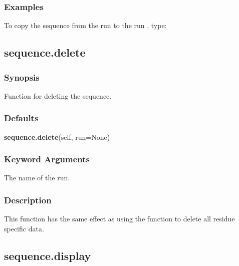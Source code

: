 \subsubsection{Examples}

To copy the sequence from the run  to the run , type:






\newpage

\subsection{sequence.delete}


\subsubsection{Synopsis}

Function for deleting the sequence.



\subsubsection{Defaults}

\textsf{\textbf{sequence.delete}(self, run=None)}


\subsubsection{Keyword Arguments}

  The name of the run. 




\subsubsection{Description}

This function has the same effect as using the  function to delete all residue specific data.




\newpage

\subsection{sequence.display}


